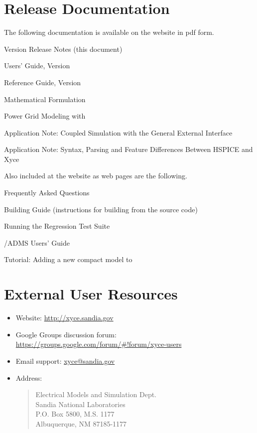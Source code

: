 \documentclass[letterpaper]{scrartcl}
\begin{document}
\section{\Xyce{} Release \XyceVersionVar{} Documentation}
The following \Xyce{} documentation is available on the \Xyce{} website in pdf
form.
\begin{XyceItemize}
  \item \Xyce{} Version \XyceVersionVar{} Release Notes (this document)
  \item \Xyce{} Users' Guide, Version \XyceVersionVar{}
  \item \Xyce{} Reference Guide, Version \XyceVersionVar{}
  \item \Xyce{} Mathematical Formulation
  \item Power Grid Modeling with \Xyce{}
  \item Application Note: Coupled Simulation with the \Xyce{} General
    External Interface
  \item Application Note: Syntax, Parsing and Feature Differences Between
    HSPICE and Xyce \XyceVersionVar{}
\end{XyceItemize}
Also included at the \Xyce{} website as web pages are the following.
\begin{XyceItemize}
  \item Frequently Asked Questions
  \item Building Guide (instructions for building \Xyce{} from the source code)
  \item Running the \Xyce{} Regression Test Suite
  \item \Xyce{}/ADMS Users' Guide
  \item Tutorial:  Adding a new compact model to \Xyce{}
\end{XyceItemize}


\section{External User Resources}
\begin{itemize}
  \item Website: {\color{XyceDeepRed}\url{http://xyce.sandia.gov}}
  \item Google Groups discussion forum:
    {\color{XyceDeepRed}\url{https://groups.google.com/forum/#!forum/xyce-users}}
  \item Email support:
    {\color{XyceDeepRed}\href{mailto:xyce@sandia.gov}{xyce@sandia.gov}}
  \item Address:
    \begin{quote}
            Electrical Models and Simulation Dept.\\
            Sandia National Laboratories\\
            P.O. Box 5800, M.S. 1177\\
            Albuquerque, NM 87185-1177 \\
    \end{quote}
\end{itemize}
\end{document}
